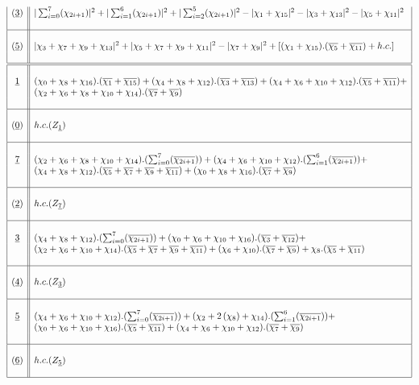 \documentclass[a4paper,11pt]{article}
\newcommand{\ch}[1]{\chi_{#1}}
\newcommand{\och}[1]{\overline{\chi_{#1}}}
\newcommand{\ud}[1]{\underline{#1}}
\newcommand{\xaa}[2]{|\chi_{#1} + \chi_{#2}|^2}
\newcommand{\xaaaa}[4]{|\chi_{#1} + \chi_{#2}+ \chi_{#3}+ \chi_{#4}|^2}
\begin{document}
\begin{table}
$$\begin{array}{|c||l|}
(\ud3)  & |\sum_{i=0}^{7}(\ch{2i+1})|^{2} + |\sum_{i=1}^{6}(\ch{2i+1})|^{2} +
|\sum_{i=2}^{5}(\ch{2i+1})|^{2} - \xaa{1}{15} - \xaa{3}{13} - \xaa{5}{11} \\
{}  &  {}  \\
\hline
{}  &  {}  \\
(\ud5)   & \xaaaa{3}{7}{9}{13} + \xaaaa{5}{7}{9}{11}- \xaa{7}{9} +
[(\ch{1}+  \ch{15}).(\och{5} + \och{11}) + h.c.] \\
{}  &  {}  \\
\hline
\hline
{}  &  {} \\
\ud1  & (\ch{0} + \ch{8} + \ch{16}).(\och{1} + \och{15}) + (\ch{4} +
\ch{8} + \ch{12}).(\och{3} + \och{13}) + (\ch{4} + \ch{6} + \ch{10} +
\ch{12}).(\och{5} + \och{11}) + \\
{} &  (\ch{2} + \ch{6} + \ch{8} +\ch{10} + \ch{14}).(\och{7} + \och{9}) \\
{}  &  {}  \\
\hline
{}  &  {}  \\
(\ud0)  &  h.c.(Z_{\ud1}) \\
{}  &  {}  \\
\hline
{}  &  {}  \\
\ud7  &  (\ch{2} + \ch{6} + \ch{8} + \ch{10} +
\ch{14}).(\sum_{i=0}^{7}(\och{2i+1}))+ (\ch{4} + \ch{6} + \ch{10} +
\ch{12}).(\sum_{i=1}^{6}(\och{2i+1})) + \\
{}  & (\ch{4} + \ch{8} + \ch{12}).(\och{5} + \och{7} + \och{9} + \och{11})
+ (\ch{0} + \ch{8} + \ch{16}).(\och{7} + \och{9}) \\
{}  &  {}  \\
\hline
{}  &  {}  \\
(\ud2)  &  h.c.(Z_{\ud7}) \\
{}  &  {}  \\
\hline
{}  &  {}  \\
\ud3  & (\ch{4} + \ch{8} + \ch{12}).(\sum_{i=0}^{7}(\och{2i+1})) +
(\ch{0} + \ch{6} + \ch{10} + \ch{16}).(\och{3} + \och{12}) + \\
{}  & (\ch{2} + \ch{6} + \ch{10} + \ch{14}).(\och{5} + \och{7} +
\och{9} + \och{11}) + (\ch{6} + \ch{10}).(\och{7} + \och{9}) +
\ch{8}.(\och{5} + \och{11}) \\
{}  &  {}  \\
\hline
{}  &  {}  \\
(\ud4)  &  h.c.(Z_{\ud3}) \\
{}  &  {}  \\
\hline
{}  &  {}  \\
\ud5  & (\ch{4} + \ch{6} + \ch{10} + \ch{12}).(\sum_{i=0}^{7}(\och{2i+1})) +
(\ch{2} + 2\, (\ch{8}) + \ch{14}).(\sum_{i=1}^{6}(\och{2i+1})) + \\
{}  & (\ch{0} + \ch{6} + \ch{10} + \ch{16}).(\och{5} + \och{11}) +
(\ch{4} + \ch{6} + \ch{10} + \ch{12}).(\och{7} + \och{9}) \\
{}  &  {}  \\
\hline
{}  &  {}  \\
(\ud6)  &  h.c.(Z_{\ud5}) \\
{}  &  {}  \\
\hline
\end{array}
$$
\caption{Twisted partition functions for the $E_7$ model}
\end{table}
\end{document}
